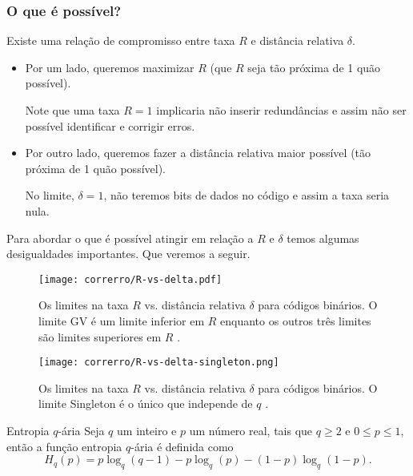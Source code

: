 \begin{frame}[allowframebreaks]
  \frametitle{O que é possível?}
  Existe uma relação de compromisso entre taxa $R$ e distância relativa $\delta$.
  \begin{itemize}
    \item Por um lado, queremos maximizar $R$ (que $R$ seja tão próxima de 1 quão possível).\\
    \begin{small}Note que uma taxa $R=1$ implicaria não inserir redundâncias e assim não ser possível identificar e corrigir erros.\end{small}
    \item Por outro lado, queremos fazer a distância relativa maior possível (tão próxima de 1 quão possível).
    \begin{footnotesize}No limite, $\delta = 1$, não teremos bits de dados no código e assim a taxa seria nula.\end{footnotesize}
  \end{itemize}
  Para abordar o que é possível atingir em relação a $R$ e $\delta$ temos algumas desigualdades importantes. Que veremos a seguir.

  \framebreak
  \begin{figure}
    \centering
    \texttt{[image: correrro/R-vs-delta.pdf]}
  \caption{Os limites na taxa $R$ vs. distância relativa $\delta$ para códigos binários. O limite GV é um limite inferior em $R$ enquanto os outros três limites são limites superiores em $R$ \citep{guruswami2023}.}\label{fig-R-vs-delta}
  \end{figure}

  \framebreak
  \begin{figure}
    \centering
    \texttt{[image: correrro/R-vs-delta-singleton.png]}
  \caption{Os limites na taxa $R$ vs. distância relativa $\delta$ para códigos binários. O limite Singleton é o único que independe de $q$ \citep{wootters2021}.}\label{fig-R-vs-delta-singleton}
  \end{figure}

  \framebreak
  \begin{block}{Entropia $q$-ária}
    Seja $q$ um inteiro e $p$ um número real, tais que $q \geq 2$ e $0 \leq p \leq 1$, então a função entropia $q$-ária é definida como
    \begin{equation}
      H_q(p) = p \log_q (q-1) - p \log_q (p) - (1-p) \log_q (1-p).
    \end{equation}
  \end{block}


\end{frame}
